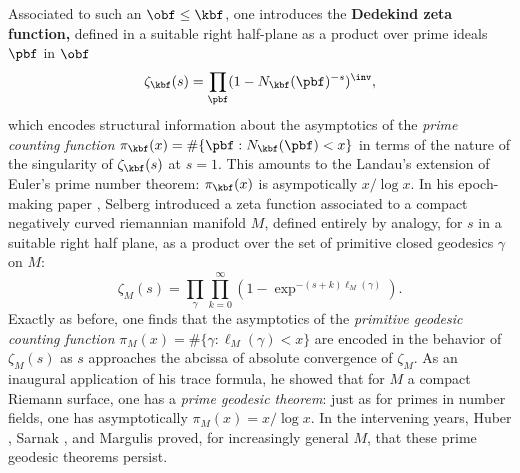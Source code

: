 \documentclass[11pt]{article}
\begin{document}
	Associated to such an  $\obf \leq \kbf$, one introduces the {\bf Dedekind zeta function,}  defined in a suitable right half-plane as a product over prime ideals $\pbf$ in $\obf$ 
	\[ \zeta_\kbf (s)  = \prod_{\pbf} 	( 1 - N_\kbf (\pbf)^{-s})^\inv, \]   
	which encodes structural information about the asymptotics of the \emph{prime counting function} $ \pi_\kbf (x) = \# \{ \pbf : N_\kbf(\pbf) < x\}$  in terms of the nature of the singularity of $\zeta_\kbf (s)$ at $s=1$. This amounts to the Landau's extension of Euler's prime number theorem:  $\pi_\kbf(x)$ is asympotically $x/\log x$.   In his epoch-making paper \cite{selberg1956harmonic}, Selberg introduced a zeta function associated to a compact negatively curved riemannian manifold $M$, defined entirely by analogy, for $s$ in a suitable right half plane, as a product over the set of primitive closed geodesics $\gamma$ on $M$:
	\[	\zeta_M(s) = \prod_{\gamma} \prod_{k=0}^\infty   ( 1 -  \exp^{-(s+k) \ell_M(\gamma) }  ) .\label{szf}\]
	Exactly as before, one finds that the asymptotics of the \emph{primitive geodesic counting function} $\pi_M(x) = \# \{ \gamma : \ell_M (\gamma)  < x\}$ are encoded in the behavior of $\zeta_M(s)$ as $s$  approaches the abcissa of absolute convergence of $\zeta_M$.  As an inaugural application of his trace formula, he showed that for $M$ a compact Riemann surface, one has a \emph{prime geodesic theorem}: just as for primes in number fields, one has asymptotically $\pi_M(x) = x / \log x$. In the intervening years, Huber \cite{huber1959}, Sarnak \cite{sarnak1981}, and Margulis \cite{margulis1969} proved, for increasingly general $M$, that these prime geodesic theorems persist. 
	
\end{document}
